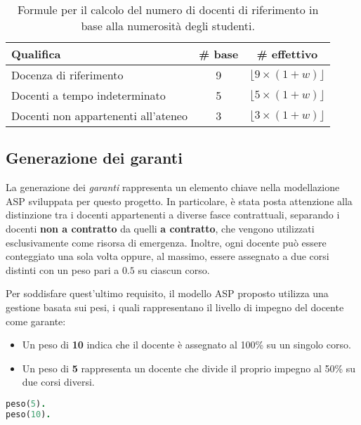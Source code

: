 \begin{table}[h]
    \centering
    \renewcommand{\arraystretch}{1.5}
    \begin{tabular}{|l|c|c|}
    \hline
    \textbf{Qualifica} & \textbf{\# base} & \textbf{\# effettivo} \\
    \hline
    Docenza di riferimento & 9 & $\lfloor 9 \times (1+w) \rfloor$ \\
    \hline
    Docenti a tempo indeterminato & 5 & $\lfloor 5 \times (1+w) \rfloor$ \\
    \hline
    Docenti non appartenenti all'ateneo & 3 & $\lfloor 3 \times (1+w) \rfloor$ \\
    \hline
    \end{tabular}
    \caption{Formule per il calcolo del numero di docenti di riferimento in base alla numerosità degli studenti.}
    \label{tab:formula-w}
\end{table}

\subsection{Generazione dei garanti}\label{sec:garanti}

La generazione dei \textit{garanti} rappresenta un elemento chiave nella modellazione ASP 
sviluppata per questo progetto. In particolare, è stata posta attenzione alla distinzione 
tra i docenti appartenenti a diverse fasce contrattuali, separando i docenti 
\textbf{non a contratto} da quelli \textbf{a contratto}, che vengono utilizzati 
esclusivamente come risorsa di emergenza.
Inoltre, ogni docente può essere conteggiato una sola volta oppure, al massimo, essere 
assegnato a due corsi distinti con un peso pari a $0.5$ su ciascun corso. 

Per soddisfare quest'ultimo requisito, il modello ASP proposto utilizza una gestione 
basata sui pesi, i quali rappresentano il livello di impegno del docente come garante:
\begin{itemize}
    \item Un peso di \textbf{10} indica che il docente è assegnato al 100\% su un singolo corso.
    \item Un peso di \textbf{5} rappresenta un docente che divide il proprio impegno al 50\% su due corsi diversi.
\end{itemize}

\begin{lstlisting}[language=prolog, caption=Generazione dei pesi.]
% Predicati di base per definire i pesi possibili.
peso(5).
peso(10).
\end{lstlisting}

